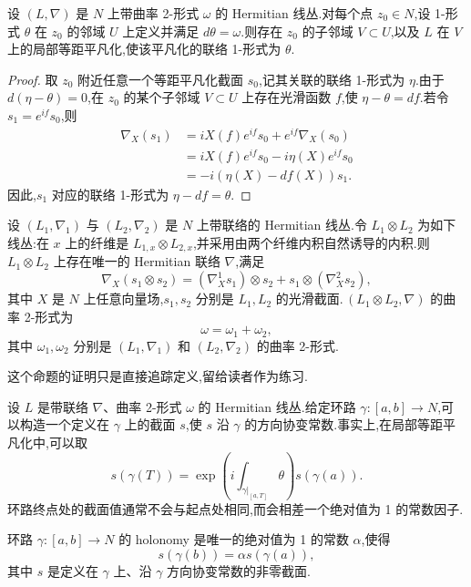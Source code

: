 \begin{proposition}[辛势的局部平凡化]
\label{prop:symplectic-potential-local-trivialization}
设 $(L,\nabla)$ 是 $N$ 上带曲率 2-形式 $\omega$ 的 Hermitian 线丛.对每个点 $z_0\in N$,设 1-形式 $\theta$ 在 $z_0$ 的邻域 $U$ 上定义并满足 $d\theta=\omega$.则存在 $z_0$ 的子邻域 $V\subset U$,以及 $L$ 在 $V$ 上的局部等距平凡化,使该平凡化的联络 1-形式为 $\theta$.
\end{proposition}

\begin{proof}
取 $z_0$ 附近任意一个等距平凡化截面 $s_0$,记其关联的联络 1-形式为 $\eta$.由于 $d(\eta-\theta)=0$,在 $z_0$ 的某个子邻域 $V\subset U$ 上存在光滑函数 $f$,使 $\eta-\theta=df$.若令 $s_1=e^{if}s_0$,则
\[
\begin{aligned}
 \nabla_X(s_1)
 &=iX(f)e^{if}s_0+e^{if}\nabla_X(s_0)\\
 &=iX(f)e^{if}s_0-i\eta(X)e^{if}s_0\\
 &=-i(\eta(X)-df(X))s_1.
\end{aligned}
\]
因此,$s_1$ 对应的联络 1-形式为 $\eta-df=\theta$.
\end{proof}

\begin{proposition}[张量积联络]
\label{prop:tensor-product-line-bundle-connection}
设 $(L_1,\nabla_1)$ 与 $(L_2,\nabla_2)$ 是 $N$ 上带联络的 Hermitian 线丛.令 $L_1\otimes L_2$ 为如下线丛:在 $x$ 上的纤维是 $L_{1,x}\otimes L_{2,x}$,并采用由两个纤维内积自然诱导的内积.则 $L_1\otimes L_2$ 上存在唯一的 Hermitian 联络 $\nabla$,满足
\[
 \nabla_X(s_1\otimes s_2)
 =(\nabla_X^1s_1)\otimes s_2+s_1\otimes(\nabla_X^2s_2),
 \label{eq:tensor-product-connection}
\]
其中 $X$ 是 $N$ 上任意向量场,$s_1,s_2$ 分别是 $L_1,L_2$ 的光滑截面.$\,(L_1\otimes L_2,\nabla)$ 的曲率 2-形式为
\[
 \omega=\omega_1+\omega_2,
\]
其中 $\omega_1,\omega_2$ 分别是 $(L_1,\nabla_1)$ 和 $(L_2,\nabla_2)$ 的曲率 2-形式.
\end{proposition}

这个命题的证明只是直接追踪定义,留给读者作为练习.

设 $L$ 是带联络 $\nabla$、曲率 2-形式 $\omega$ 的 Hermitian 线丛.给定环路 $\gamma:[a,b]\to N$,可以构造一个定义在 $\gamma$ 上的截面 $s$,使 $s$ 沿 $\gamma$ 的方向协变常数.事实上,在局部等距平凡化中,可以取
\[
 s(\gamma(T))
 =\exp\left(i\int_{\gamma|_{[a,T]}}\theta\right)s(\gamma(a)).
 \label{eq:parallel-transport-section}
\]
环路终点处的截面值通常不会与起点处相同,而会相差一个绝对值为 1 的常数因子.

\begin{definition}[Holonomy]
\label{def:holonomy}
环路 $\gamma:[a,b]\to N$ 的 holonomy 是唯一的绝对值为 1 的常数 $\alpha$,使得
\[
 s(\gamma(b))=\alpha s(\gamma(a)),
\]
其中 $s$ 是定义在 $\gamma$ 上、沿 $\gamma$ 方向协变常数的非零截面.
\end{definition}

